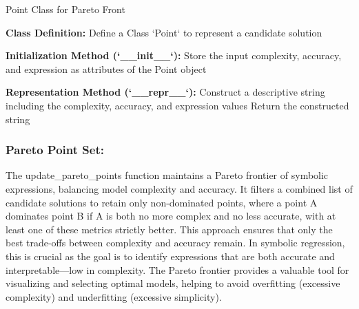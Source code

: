 \documentclass{article}
\begin{document}
\begin{algorithm}[H]
\SetAlgoLined %
\caption{Point Class for Pareto Front}
\label{alg:point_class} %

\textbf{Class Definition:}\;
Define a Class `Point` to represent a candidate solution\;

\textbf{Initialization Method (`__init__`):}\;
\;
Store the input complexity, accuracy, and expression as attributes of the Point object\;

\textbf{Representation Method (`__repr__`):}\;
\;
Construct a descriptive string including the complexity, accuracy, and expression values\;
Return the constructed string\;

\end{algorithm}



\subsubsection{Pareto Point Set:}


The update_pareto_points function maintains a Pareto frontier of symbolic expressions, balancing model complexity and accuracy. It filters a combined list of candidate solutions to retain only non-dominated points, where a point A dominates point B if A is both no more complex and no less accurate, with at least one of these metrics strictly better. This approach ensures that only the best trade-offs between complexity and accuracy remain. In symbolic regression, this is crucial as the goal is to identify expressions that are both accurate and interpretable—low in complexity. The Pareto frontier provides a valuable tool for visualizing and selecting optimal models, helping to avoid overfitting (excessive complexity) and underfitting (excessive simplicity).\\
\end{document}
